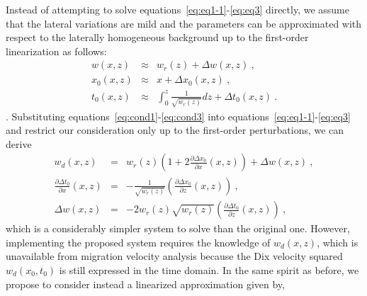 Instead of attempting to solve equations~\ref{eq:eq1-1}-\ref{eq:eq3} directly, we assume that the lateral variations are mild and the parameters can be approximated with respect to the laterally homogeneous background up to the first-order linearization as follows:
\begin{eqnarray}
\label{eq:cond1}
w (x,z) & \approx & w_r(z) + \Delta w(x,z)~,\\
\label{eq:cond2}
x_0 (x,z) & \approx & x + \Delta x_0(x,z)~,\\
\label{eq:cond3}
t_0 (x,z)& \approx & \int_0^z \frac{1}{\sqrt{w_r(z)}} dz  + \Delta t_0(x,z)~.
\end{eqnarray}
.  Substituting equations~\ref{eq:cond1}-\ref{eq:cond3} into equations~\ref{eq:eq1-1}-\ref{eq:eq3} and restrict our consideration only up to the first-order perturbations, we can derive
\begin{eqnarray}
\label{eq:eq1weak}
w_d (x,z) & = & w_r (z) \left(1+ 2\frac{\partial \Delta x_0 }{\partial x}(x,z) \right) + \Delta w(x,z)~,\\
\label{eq:eq2weak}
\frac{\partial \Delta t_0 }{\partial x}(x,z) & = & -\frac{1}{\sqrt{w_r(z)}} \left(\frac{\partial \Delta x_0 }{\partial z}(x,z)\right)~,\\
\label{eq:eq3weak}
\Delta w(x,z) & = & -2 w_r(z)\sqrt{w_r(z)} \left(\frac{\partial \Delta t_0 }{\partial z}(x,z)\right)~,
\end{eqnarray}
which is a considerably simpler system to solve than the original one. However, implementing the proposed system requires the knowledge of $w_d (x,z)$, which is unavailable from migration velocity analysis because the Dix velocity squared $w_d (x_0,t_0)$ is still expressed in the time domain. In the same spirit as before, we propose to consider instead a linearized approximation given by,
